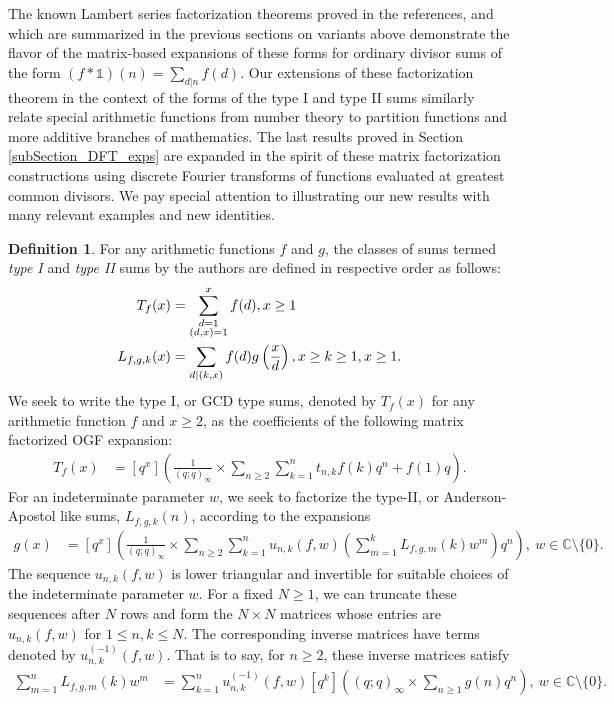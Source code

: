 \documentclass[12pt,reqno,a4letter]{article}
\numberwithin{figure}{section}
\numberwithin{table}{section}
\numberwithin{equation}{section}
\theoremstyle{plain}
\numberwithin{theorem}{section}
\theoremstyle{definition}
\newtheorem{definition}[theorem]{Definition}
\begin{document}
The known Lambert series factorization theorems 
proved in the references, and which are summarized in 
the previous sections on variants above 
demonstrate the flavor of the matrix-based expansions of these forms for 
ordinary divisor sums of the form $(f \ast \mathds{1})(n) = \sum_{d|n} f(d)$. 
Our extensions of these factorization theorem in the context of the 
forms of the type I and type II sums similarly relate special arithmetic functions 
from number theory to partition functions and more additive branches of mathematics. 
The last results proved in 
Section \ref{subSection_DFT_exps} are expanded in the spirit of these 
matrix factorization constructions using discrete Fourier transforms of functions 
evaluated at greatest common divisors. We pay special 
attention to illustrating our new results with many relevant examples and 
new identities.

\begin{definition}
\label{def_TypeITypeIISums_v1}
For any arithmetic functions $f$ and $g$, 
the classes of sums termed \emph{type I} and \emph{type II} sums by the authors 
are defined in respective order as follows:
\begin{align} 
\label{eqn_sum_vars_TL_defs_intro} 
T_{f}(x) & = \sum_{\substack{d=1 \\ (d,x)=1}}^x f(d), x \geq 1 \\ 
\notag 
L_{f,g,k}(x) & = \sum_{d|(k,x)} f(d) g\left(\frac{x}{d}\right), x \geq k \geq 1, x \geq 1. 
\end{align}
We seek to write the type I, or GCD type sums, denoted by $T_f(x)$ 
for any arithmetic function $f$ and $x \geq 2$, 
as the coefficients of the following matrix factorized OGF expansion:
\begin{align} 
\label{eqn_intro_two_sum_fact_types_def_v1}
T_{f}(x) & = [q^x]\left(\frac{1}{(q; q)_{\infty}} \times \sum_{n \geq 2} \sum_{k=1}^n t_{n,k} f(k) q^n + 
     f(1) q\right). 
\end{align} 
For an indeterminate parameter $w$, we seek to factorize the type-II, or Anderson-Apostol like sums, 
$L_{f,g,k}(n)$, according to the expansions 
\begin{align}
\label{eqn_intro_two_sum_fact_types_def_v2}
g(x) & = [q^x]\left(\frac{1}{(q; q)_{\infty}} \times 
     \sum_{n \geq 2} \sum_{k=1}^n u_{n,k}(f, w) \left(
     \sum_{m=1}^k L_{f,g,m}(k) w^m\right) q^n\right),\ w \in \mathbb{C} \setminus \{0\}. 
\end{align} 
The sequence $u_{n,k}(f, w)$ is lower triangular and 
invertible for suitable choices of the indeterminate parameter $w$. 
For a fixed $N \geq 1$, we can truncate these sequences after $N$ rows 
and form the $N \times N$ matrices whose entries are 
$u_{n,k}(f, w)$ for $1 \leq n,k \leq N$. 
The corresponding inverse matrices have terms denoted by 
$u_{n,k}^{(-1)}(f, w)$. 
That is to say, for $n \geq 2$, these inverse matrices satisfy 
\begin{align} 
\label{eqn_intro_two_sum_fact_types_def_v4_invs}
\sum_{m=1}^n L_{f,g,m}(k) w^m & = \sum_{k=1}^n u_{n,k}^{(-1)}(f, w) [q^k] \left((q; q)_{\infty} 
     \times \sum_{n \geq 1} g(n) q^n\right),\ w \in \mathbb{C} \setminus \{0\}.
\end{align} 
\end{definition}
\end{document}
